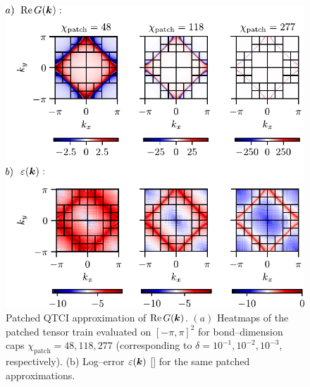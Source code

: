 \begin{figure}[ht!]
    \centering 
    \includegraphics{figures/2DGreenErrorHeatmap.pdf}
    \caption{Patched QTCI approximation of
           \(\operatorname{Re}G(\boldsymbol{k})\).
           $(a)$ Heatmaps of the patched tensor train evaluated on \([-\pi,\pi]^{2}\) for bond–dimension caps \(\chi_{\text{patch}}=48,118,277\) (corresponding to
           \(\delta=10^{-1},10^{-2},10^{-3}\), respectively).
           (b) Log–error \(\varepsilon(\boldsymbol{k})\) []
           for the same patched approximations. }
    \label{fig:2DGreenErrorHeatmap}
\end{figure}

